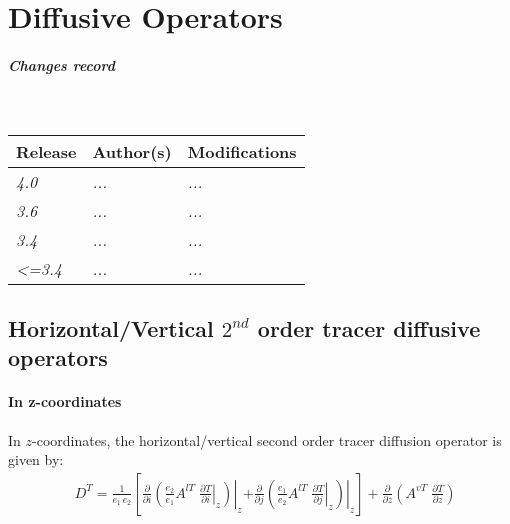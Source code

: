 \documentclass[../main/NEMO_manual]{subfiles}
\begin{document}
\chapter{Diffusive Operators}
\label{apdx:DIFFOPERS}

\thispagestyle{plain}

\chaptertoc

\paragraph{Changes record} ~\\

{\footnotesize
  \begin{tabularx}{\textwidth}{l||X|X}
    Release & Author(s) & Modifications \\
    \hline
    {\em   4.0} & {\em ...} & {\em ...} \\
    {\em   3.6} & {\em ...} & {\em ...} \\
    {\em   3.4} & {\em ...} & {\em ...} \\
    {\em <=3.4} & {\em ...} & {\em ...}
  \end{tabularx}
}

\clearpage

\section{Horizontal/Vertical $2^{nd}$ order tracer diffusive operators}
\label{sec:DIFFOPERS_1}

\subsubsection*{In z-coordinates}

In $z$-coordinates, the horizontal/vertical second order tracer diffusion operator is given by:
\begin{align}
  \label{eq:DIFFOPERS_1}
  &D^T = \frac{1}{e_1 \, e_2}      \left[
    \left. \frac{\partial}{\partial i} \left( 	\frac{e_2}{e_1}A^{lT} \;\left. \frac{\partial T}{\partial i} \right|_z   \right)   \right|_z      \right.
    \left.
    + \left. \frac{\partial}{\partial j} \left(  \frac{e_1}{e_2}A^{lT} \;\left. \frac{\partial T}{\partial j} \right|_z   \right)   \right|_z      \right]
    + \frac{\partial }{\partial z}\left( {A^{vT} \;\frac{\partial T}{\partial z}} \right)
\end{align}
\end{document}
